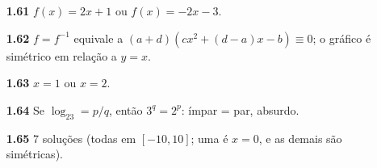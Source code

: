 {\begin{multicols}{2}
\begin{itemize}[leftmargin=2.7em,labelsep=0.5em,itemsep=1pt]
\item[\textbf{1.61}] $f(x)=2x+1$ ou $f(x)=-2x-3$.
\item[\textbf{1.62}] $f=f^{-1}$ equivale a $(a+d)(cx^2+(d-a)x-b)\equiv0$; o gráfico é simétrico em relação a $y=x$.
\item[\textbf{1.63}] $x=1$ ou $x=2$.
\item[\textbf{1.64}] Se $\log_23=p/q$, então $3^q=2^p$: ímpar = par, absurdo.
\item[\textbf{1.65}] 7 soluções (todas em $[-10,10]$; uma é $x=0$, e as demais são simétricas).
\end{itemize}\end{multicols}}
